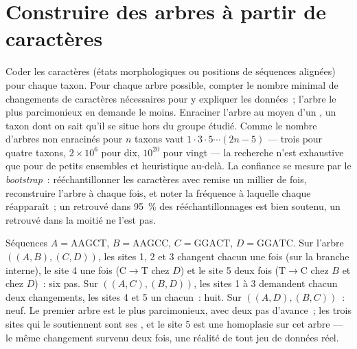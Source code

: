 \section{Construire des arbres à partir de caractères}

\begin{method}[La parcimonie]\label{meth:b2:phylogenetic-trees:parsimony}
Coder les caractères (états morphologiques ou positions de séquences
alignées) pour chaque taxon. Pour chaque arbre possible, compter le
nombre minimal de changements de caractères nécessaires pour y expliquer
les données~; l'arbre le plus parcimonieux en demande le moins. Enraciner
l'arbre au moyen d'un
\emph{}, un taxon dont on sait qu'il se situe hors du groupe
étudié. Comme le nombre d'arbres non enracinés pour $n$ taxons vaut $1\cdot 3\cdot
5\cdots(2n - 5)$ --- trois pour quatre taxons, $2\times 10^{6}$ pour dix,
$10^{20}$ pour vingt --- la recherche n'est exhaustive que pour de petits
ensembles et heuristique au-delà. La confiance se mesure par le
\emph{bootstrap}~: rééchantillonner les caractères avec remise un millier
de fois, reconstruire l'arbre à chaque fois, et noter la fréquence à
laquelle chaque  réapparaît~; un  retrouvé dans \qty{95}{\%} des
rééchantillonnages est bien soutenu, un  retrouvé dans la moitié ne
l'est pas.
\end{method}

\begin{example}\label{ex:b2:phylogenetic-trees:parsimony}
Séquences $A = \mathrm{AAGCT}$, $B = \mathrm{AAGCC}$, $C =
\mathrm{GGACT}$, $D = \mathrm{GGATC}$. Sur l'arbre $((A,B),(C,D))$,
les sites 1, 2 et 3 changent chacun une fois (sur la branche interne), le
site 4 une fois ($\mathrm{C}\to\mathrm{T}$ chez $D$) et le site 5 deux fois
($\mathrm{T}\to\mathrm{C}$ chez $B$ et chez $D$)~: six pas. Sur
$((A,C),(B,D))$, les sites 1 à 3 demandent chacun deux changements, les
sites 4 et 5 un chacun~: huit. Sur $((A,D),(B,C))$~: neuf. Le premier arbre
est le plus parcimonieux, avec deux pas d'avance~; les trois sites qui le
soutiennent sont ses , et le site 5 est une homoplasie sur
cet arbre --- le même changement survenu deux fois, une réalité de tout
jeu de données réel.
\end{example}

